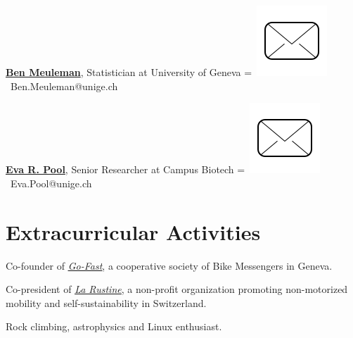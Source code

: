 \documentclass[]{plushcv}
\begin{document}
\begin{minipage}[t]{0.70\textwidth}
\sectionsep
\href{https://www.unige.ch/cisa/center/members/meuleman-ben/}{\textbf{Ben Meuleman}}, Statistician at University of Geneva
\begingroup
{}=\hbox{
\includegraphics[scale=0.1,trim={0 1cm 0cm 0cm}]{icons/main/mail.png}\hspace{0.1cm} Ben.Meuleman@unige.ch
}
\parbox{\wd0}{}\endgroup
\sectionsep



\sectionsep
\href{https://www.researchgate.net/profile/Eva-Pool}{\textbf{Eva R. Pool}}, Senior Researcher at Campus Biotech 
\begingroup
{}=\hbox{
\includegraphics[scale=0.1,trim={0 1cm 0cm 0cm}]{icons/main/mail.png}\hspace{0.1cm} Eva.Pool@unige.ch
}
\parbox{\wd0}{}\endgroup
\sectionsep

\section{Extracurricular Activities} 
\sectionsep
\sectionsep
\begin{tightemize}
\item Co-founder of \href{http://www.go-fast.ch/}{\underline{\textit{Go-Fast}}}, a cooperative society of Bike Messengers in Geneva.
\item Co-president of \href{http://www.larustine.bike/}{\underline{\textit{La Rustine}}}, a non-profit organization promoting non-motorized mobility and self-sustainability in Switzerland.
\item Rock climbing, astrophysics and Linux enthusiast.
\end{tightemize}
\end{minipage} 
\end{document}
